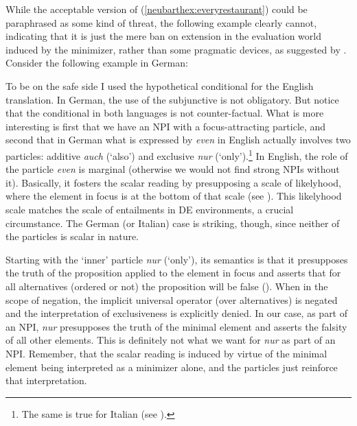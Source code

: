 \documentclass[output=paper,colorlinks,citecolor=brown,
]{langscibook}
\begin{document}
While the acceptable version of (\ref{neubarthex:everyrestaurant}) could be paraphrased as some kind of threat, the following
example clearly cannot, indicating that it is just the mere ban on extension in the evaluation world induced by the
minimizer, rather than some pragmatic devices, as suggested by \citet{linebarger1987}. Consider the following example
in German:


To be on the safe side I used the hypothetical conditional for the English translation. In German, the use of the
subjunctive is not obligatory. But notice that the conditional in both languages is not counter-factual. What is more
interesting is first that we have an NPI with a focus-attracting particle, and second that in German what is expressed
by \textit{even} in English actually involves two particles: additive \textit{auch} (`also') and exclusive \textit{nur}
(`only').\footnote{The same is true for Italian (see \citet{guerzoni03}).} In English, the role of the particle
\textit{even} is marginal (otherwise we would not find strong NPIs without it). Basically, it fosters the scalar
reading by presupposing a scale of likelyhood, where the element in focus is at the bottom of that scale (see
\citet{leehorn1994}). This likelyhood scale matches the scale of entailments in DE environments, a crucial
circumstance. The German (or Italian) case is striking, though, since neither of the particles is scalar in nature.

Starting with the `inner' particle \textit{nur} (`only'), its semantics is that it presupposes the truth of the
proposition applied to the element in focus and asserts that for all alternatives (ordered or not) the proposition will
be false (\citet{krifka1998a,wagner2005}). When in the scope of negation, the implicit universal operator (over
alternatives) is negated and the interpretation of exclusiveness is explicitly denied. In our case, as part of an NPI,
\textit{nur} presupposes the truth of the minimal element and asserts the falsity of all other elements. This is
definitely not what we want for \textit{nur} as part of an NPI. Remember, that the scalar reading is induced by virtue
of the minimal element being interpreted as a minimizer alone, and the particles just reinforce that interpretation.
\end{document}

